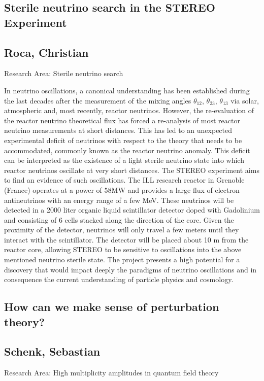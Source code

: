 \subsection*{\centering \large Sterile neutrino search in the STEREO Experiment}
\subsection*{\centering \normalsize Roca, Christian}
Research Area: \newline Sterile neutrino search

\noindent In neutrino oscillations, a canonical understanding has been established during the last decades after the measurement of the mixing angles $\theta_{12}$, $\theta_{23}$, $\theta_{13}$ via solar, atmospheric and, most recently, reactor neutrinos. However, the re-evaluation of the reactor neutrino theoretical flux has forced a re-analysis of most reactor neutrino measurements
at short distances. This has led to an unexpected experimental deficit of neutrinos with respect to the theory that needs to be accommodated, commonly known as the reactor neutrino anomaly. This deficit can be interpreted as the existence of a light sterile neutrino state into which reactor neutrinos oscillate at very short distances. The STEREO experiment aims to find an evidence of such oscillations.\newline
The ILL research reactor in Grenoble (France) operates at a power of 58MW and provides a large flux of electron antineutrinos with an energy range of a few MeV. These neutrinos will be detected in a 2000 liter organic liquid scintillator detector doped with Gadolinium and consisting of 6 cells stacked along the direction of the core. Given the proximity of the detector, neutrinos will only travel a few meters until they interact with the scintillator. The detector will be placed
about 10 m from the reactor core, allowing STEREO to be sensitive to oscillations into the above mentioned neutrino sterile state. The project presents a high potential for a discovery that would impact deeply the paradigms of neutrino oscillations and in consequence the current understanding of particle physics and cosmology.
\newpage
\subsection*{\centering \large How can we make sense of perturbation theory?}
\subsection*{\centering \normalsize Schenk, Sebastian}
Research Area:  High multiplicity amplitudes in quantum field theory\newline

